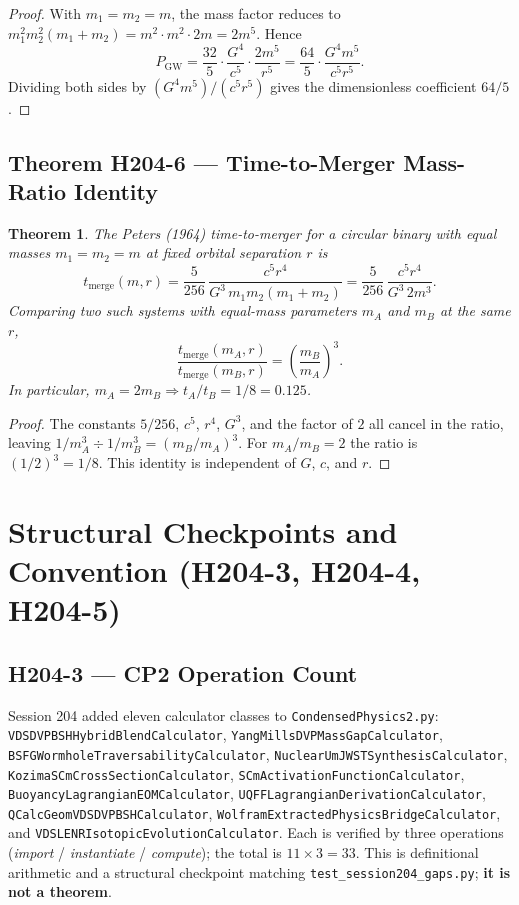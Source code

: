 \documentclass[11pt,letterpaper]{article}
\newtheorem{theorem}{Theorem}
\theoremstyle{definition}
\begin{document}
\begin{proof}
With $m_1 = m_2 = m$, the mass factor reduces to
$m_1^2 m_2^2 (m_1 + m_2) = m^2 \cdot m^2 \cdot 2m = 2 m^5$. Hence
\[
   P_{\mathrm{GW}}
   = \frac{32}{5} \cdot \frac{G^4}{c^5} \cdot \frac{2 m^5}{r^5}
   = \frac{64}{5} \cdot \frac{G^4 m^5}{c^5 r^5}.
\]
Dividing both sides by $(G^4 m^5)/(c^5 r^5)$ gives the dimensionless
coefficient $64/5$.
\end{proof}

\subsection{Theorem H204-6 --- Time-to-Merger Mass-Ratio Identity}

\begin{theorem}\label{thm:tmerge}
The Peters (1964) time-to-merger for a circular binary with equal masses
$m_1 = m_2 = m$ at fixed orbital separation $r$ is
\[
   t_{\mathrm{merge}}(m, r)
   = \frac{5}{256} \, \frac{c^5 r^4}{G^3 \, m_1 m_2 (m_1 + m_2)}
   = \frac{5}{256} \, \frac{c^5 r^4}{G^3 \, 2 m^3}.
\]
Comparing two such systems with equal-mass parameters $m_A$ and $m_B$ at
the same $r$,
\[
   \frac{t_{\mathrm{merge}}(m_A, r)}{t_{\mathrm{merge}}(m_B, r)}
   = \left(\frac{m_B}{m_A}\right)^{3}.
\]
In particular, $m_A = 2 m_B \Rightarrow t_A / t_B = 1/8 = 0.125$.
\end{theorem}

\begin{proof}
The constants $5/256$, $c^5$, $r^4$, $G^3$, and the factor of $2$ all
cancel in the ratio, leaving $1/m_A^3 \div 1/m_B^3 = (m_B/m_A)^3$. For
$m_A/m_B = 2$ the ratio is $(1/2)^3 = 1/8$. This identity is independent
of $G$, $c$, and $r$.
\end{proof}

\section{Structural Checkpoints and Convention (H204-3, H204-4, H204-5)}

\subsection{H204-3 --- CP2 Operation Count}

Session 204 added eleven calculator classes to \texttt{CondensedPhysics2.py}:
\texttt{VDSDVPBSHHybridBlendCalculator}, \texttt{YangMillsDVPMassGapCalculator},
\texttt{BSFGWormholeTraversabilityCalculator}, \texttt{NuclearUmJWSTSynthesisCalculator},
\texttt{KozimaSCmCrossSectionCalculator}, \texttt{SCmActivationFunctionCalculator},
\texttt{BuoyancyLagrangianEOMCalculator}, \texttt{UQFFLagrangianDerivationCalculator},
\texttt{QCalcGeomVDSDVPBSHCalculator}, \texttt{WolframExtractedPhysicsBridgeCalculator},
and \texttt{VDSLENRIsotopicEvolutionCalculator}. Each is verified by three
operations (\emph{import} / \emph{instantiate} / \emph{compute}); the
total is $11 \times 3 = 33$. This is definitional arithmetic and a
structural checkpoint matching \texttt{test\_session204\_gaps.py};
\textbf{it is not a theorem}.
\end{document}
